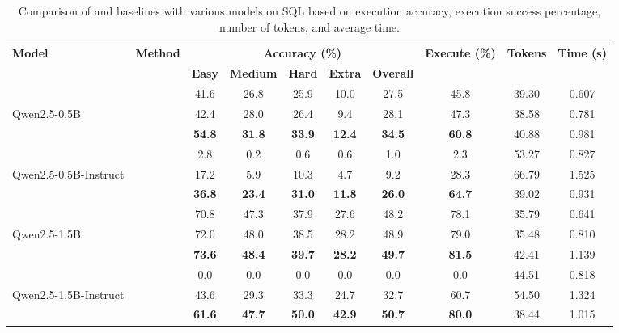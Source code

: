 \begin{table}[t]
    \scriptsize
    \centering
    \caption{Comparison of \Tool{} and baselines with various models on SQL based on execution accuracy, execution success percentage, number of tokens, and average time.}
    \begin{tabular}{llcccccccc}
        \toprule
        \multirow{2}{*}{\textbf{Model}} & \multirow{2}{*}{\textbf{Method}} & \multicolumn{5}{c}{\textbf{Accuracy (\%)}} & \multirow{2}{*}{\textbf{Execute (\%)}} & \multirow{2}{*}{\textbf{Tokens}} & \multirow{2}{*}{\textbf{Time (s)}} \\
        \cmidrule(lr){3-7}
        & & \textbf{Easy} & \textbf{Medium} & \textbf{Hard} & \textbf{Extra} & \textbf{Overall} & & & \\
        
\midrule

     & \standard{} & 41.6 & 26.8 & 25.9 & 10.0 & 27.5 & 45.8 & 39.30 & 0.607 \\
Qwen2.5-0.5B & \syncode{} & 42.4 & 28.0 & 26.4 & 9.4 & 28.1 & 47.3 & 38.58 & 0.781 \\
\textbf{} & \Tool{} & \textbf{54.8} & \textbf{31.8} & \textbf{33.9} & \textbf{12.4} & \textbf{34.5} & \textbf{60.8} & 40.88 & 0.981 \\

            \midrule
             & \standard{} & 2.8 & 0.2 & 0.6 & 0.6 & 1.0 & 2.3 & 53.27 & 0.827 \\
Qwen2.5-0.5B-Instruct & \syncode{} & 17.2 & 5.9 & 10.3 & 4.7 & 9.2 & 28.3 & 66.79 & 1.525 \\
\textbf{} & \Tool{} & \textbf{36.8} & \textbf{23.4} & \textbf{31.0} & \textbf{11.8} & \textbf{26.0} & \textbf{64.7} & 39.02 & 0.931 \\

            \midrule
             & \standard{} & 70.8 & 47.3 & 37.9 & 27.6 & 48.2 & 78.1 & 35.79 & 0.641 \\
Qwen2.5-1.5B & \syncode{} & 72.0 & 48.0 & 38.5 & 28.2 & 48.9 & 79.0 & 35.48 & 0.810 \\
\textbf{} & \Tool{} & \textbf{73.6} & \textbf{48.4} & \textbf{39.7} & \textbf{28.2} & \textbf{49.7} & \textbf{81.5} & 42.41 & 1.139 \\

            \midrule
             & \standard{} & 0.0 & 0.0 & 0.0 & 0.0 & 0.0 & 0.0 & 44.51 & 0.818 \\
Qwen2.5-1.5B-Instruct & \syncode{} & 43.6 & 29.3 & 33.3 & 24.7 & 32.7 & 60.7 & 54.50 & 1.324 \\
\textbf{} & \Tool{} & \textbf{61.6} & \textbf{47.7} & \textbf{50.0} & \textbf{42.9} & \textbf{50.7} & \textbf{80.0} & 38.44 & 1.015 \\


\end{tabular}
\end{table}
